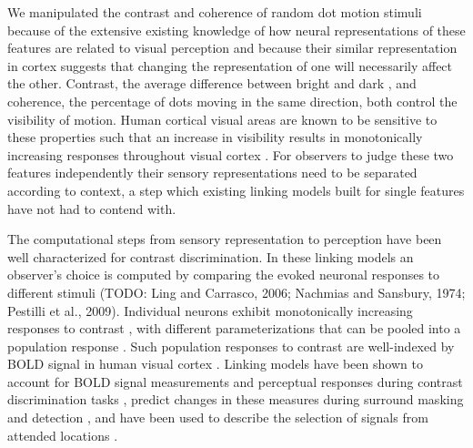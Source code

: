 \documentclass{report}
\begin{document}
We manipulated the contrast and coherence of random dot motion stimuli because of the extensive existing knowledge of how neural representations of these features are related to  visual perception \citep{Gold2007-ys} and because their similar representation in cortex suggests that changing the representation of one will necessarily affect the other. Contrast, the average difference between bright and dark \citep{Bex2002-it}, and coherence, the percentage of dots moving in the same direction, both control the visibility of motion. Human cortical visual areas are known to be sensitive to these properties such that an increase in visibility results in monotonically increasing responses throughout visual cortex \citep{Avidan2002-jg,Birman2018-sp,Britten1993-oh,Gardner2005-pg,Logothetis2001-kk,Olman2004-dd,Boynton1996-ff,Olman2004-dd,Rees2000-ul,Tootell1998-bb,Simoncelli1998-ts}. For observers to judge these two features independently their sensory representations need to be separated according to context, a step which existing linking models built for single features have not had to contend with.

The computational steps from sensory representation to perception have been well characterized for contrast discrimination. In these linking models an observer’s choice is computed by comparing the evoked neuronal responses to different stimuli \citep{Boynton1999-jd,Foley1981-aw} (TODO: Ling and Carrasco, 2006; Nachmias and Sansbury, 1974; Pestilli et al., 2009). Individual neurons exhibit monotonically increasing responses to contrast \citep{Albrecht1982-rq}, with different parameterizations \citep{Tolhurst1983-cv} that can be pooled into a population response \citep{Shadlen1996-pr}. Such population responses to contrast are well-indexed by BOLD signal in human visual cortex \citep{Avidan2002-jg,Boynton1996-ff,Boynton1999-jd,Gardner2005-pg,Heeger2000-pq,Logothetis2001-kk}. Linking models have been shown to account for BOLD signal measurements and perceptual responses during contrast discrimination tasks \citep{Boynton1999-jd}, predict changes in these measures during surround masking \citep{Zenger-Landolt2003-kq} and detection \citep{Ress2000-pa}, and have been used to describe the selection of signals from attended locations \citep{Hara2014-mv,Pestilli2011-gi}. 
\end{document}
